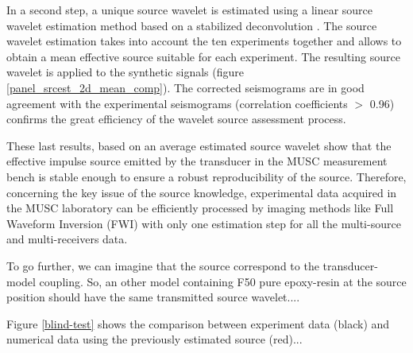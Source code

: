 \documentclass[manuscript,revised]{geophysics}
\begin{document}

\noindent In a second step, a unique source wavelet is estimated using a linear source wavelet estimation method based on a stabilized deconvolution \citep{Pratt_FWI_1999}. The source wavelet estimation takes into account the ten experiments together and allows to obtain a mean effective source suitable for each experiment. The resulting source wavelet is applied to the synthetic signals (figure \ref{panel_srcest_2d_mean_comp}). The corrected seismograms are in good agreement with the experimental seismograms (correlation coefficients $\mathrm{>}$ 0.96) confirms the great efficiency of the wavelet source assessment process.  

\noindent These last results, based on an average estimated source wavelet show that the effective impulse source emitted by the transducer in the MUSC measurement bench is stable enough to ensure a robust reproducibility of the source. Therefore, concerning the key issue of the source knowledge, experimental data acquired in the MUSC laboratory can be efficiently processed by imaging methods like Full Waveform Inversion (FWI) with only one estimation step for all the multi-source and multi-receivers data.

\noindent To go further, we can imagine that the source correspond to the transducer-model coupling. So, an other model containing F50 pure epoxy-resin at the source position should have the same transmitted source wavelet....

\noindent Figure \ref{blind-test} shows the comparison between experiment data (black) and numerical data using the previously estimated source (red)...
\end{document}
